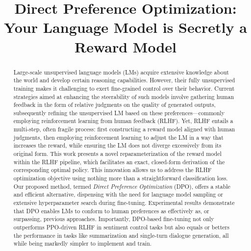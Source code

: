 \title{Direct Preference Optimization: Your Language Model is Secretly a Reward Model}

\begin{abstract}
Large-scale unsupervised language models (LMs) acquire extensive knowledge about the world and develop certain reasoning capabilities. However, their fully unsupervised training makes it challenging to exert fine-grained control over their behavior. Current strategies aimed at enhancing the steerability of such models involve gathering human feedback in the form of relative judgments on the quality of generated outputs, subsequently refining the unsupervised LM based on these preferences—commonly employing reinforcement learning from human feedback (RLHF). Yet, RLHF entails a multi-step, often fragile process: first constructing a reward model aligned with human judgments, then employing reinforcement learning to adjust the LM in a way that increases the reward, while ensuring the LM does not diverge excessively from its original form. This work presents a novel reparameterization of the reward model within the RLHF pipeline, which facilitates an exact, closed-form derivation of the corresponding optimal policy. This innovation allows us to address the RLHF optimization objective using nothing more than a straightforward classification loss. Our proposed method, termed \textit{Direct Preference Optimization} (DPO), offers a stable and efficient alternative, dispensing with the need for language model sampling or extensive hyperparameter search during fine-tuning. Experimental results demonstrate that DPO enables LMs to conform to human preferences as effectively as, or surpassing, previous approaches. Importantly, DPO-based fine-tuning not only outperforms PPO-driven RLHF in sentiment control tasks but also equals or betters the performance in tasks like summarization and single-turn dialogue generation, all while being markedly simpler to implement and train.
\end{abstract}

